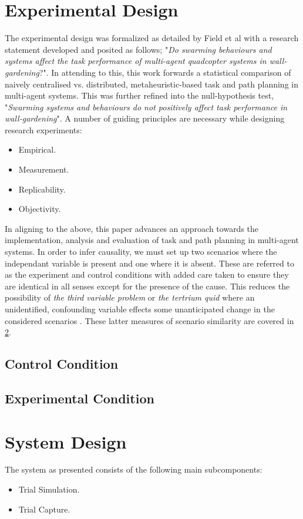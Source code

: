 \documentclass{report}
\begin{document}
\section{Experimental Design}
The experimental design was formalized as detailed by Field et al \cite{Field2012} with a research statement developed and posited as follows; "\textit{Do swarming behaviours and systems affect the task performance of multi-agent quadcopter systems in wall-gardening}?". In attending to this, this work forwards a statistical comparison of naively centralised vs. distributed, metaheuristic-based task and path planning in multi-agent systems. This was further refined into the null-hypothesis test, "\textit{Swarming systems and behaviours do not positively affect task performance in wall-gardening}". A number of guiding principles are necessary \cite{Field2012} while designing research experiments:
\begin{itemize}
	\item Empirical.
	\item Measurement.
	\item Replicability.
	\item Objectivity.
\end{itemize}

In aligning to the above, this paper advances an approach towards the implementation, analysis and evaluation of task and path planning in multi-agent systems. In order to infer causality, we must set up two scenarios where the independant variable is present and one where it is absent. These are referred to as the experiment and control conditions with added care taken to ensure they are identical in all senses except for the presence of the cause. This reduces the possibility of \textit{the third variable problem} or \textit{the tertrium quid} where an unidentified, confounding variable effects some unanticipated change in the considered scenarios \cite{Field2012}. These latter measures of scenario similarity are covered in \ref{system_design}.

\subsection{Control Condition}
\subsection{Experimental Condition}

\section{System Design} \label{system_design}
The system as presented consists of the following main subcomponents:
\begin{itemize}
	\item Trial Simulation.
	\item Trial Capture.
\end{itemize}
\end{document}
